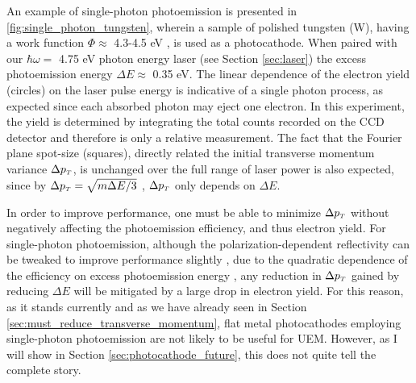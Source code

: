 An example of single-photon photoemission is presented in \ref{fig:single_photon_tungsten}, wherein a sample of polished tungsten (W), having a work function $\Phi \approx $ 4.3-4.5 eV \cite{yen_thermally_1980}, is used as a photocathode.
When paired with our $\hbar \omega = $ 4.75 eV photon energy laser (see Section \ref{sec:laser}) the excess photoemission energy $\Delta E \approx $ 0.35 eV.
The linear dependence of the electron yield (circles) on the laser pulse energy is indicative of a single photon process, as expected since each absorbed photon may eject one electron.
In this experiment, the yield is determined by integrating the total counts recorded on the CCD detector and therefore is only a relative measurement.
The fact that the Fourier plane spot-size (squares), directly related the initial transverse momentum variance $\Delta p_{{\scriptscriptstyle T}}$, is unchanged over the full range of laser power is also expected, since by $\Delta p_{{\scriptscriptstyle T}} = \sqrt{ m \Delta E / 3 } $ \cite{dowell_quantum_2009}, $\Delta p_{{\scriptscriptstyle T}}$ only depends on $\Delta E$.

In order to improve performance, one must be able to minimize $\Delta p_{{\scriptscriptstyle T}}$ without negatively affecting the photoemission efficiency, and thus electron yield.
For single-photon photoemission, although the polarization-dependent reflectivity can be tweaked to improve performance slightly \cite{berger_dc_2009}, due to the quadratic dependence of the efficiency on excess photoemission energy \cite{shalaev_electron_1994}, any reduction in $\Delta p_{{\scriptscriptstyle T}}$ gained by reducing $\Delta E$ will be mitigated by a large drop in electron yield.
For this reason, as it stands currently and as we have already seen in Section \ref{sec:must_reduce_transverse_momentum}, flat metal photocathodes employing single-photon photoemission are not likely to be useful for UEM.
However, as I will show in Section \ref{sec:photocathode_future}, this does not quite tell the complete story.

